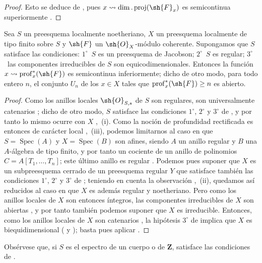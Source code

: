 \begin{proof}
Esto se deduce de , pues $x\leadsto\dim.\operatorname{proj}(\sh{F}_x)$ es semicontinua superiormente .
\end{proof}

\begin{proposition}[10.8.5]
\label{IV.10.8.5}
Sea $S$ un preesquema localmente noetheriano, $X$ un preesquema localmente de tipo finito sobre $S$ y $\sh{F}$ un $\sh{O}_X$-módulo coherente.
Supongamos que $S$ satisface las condiciones: $1^\circ$~$S$ es un preesquema de Jacobson; $2^\circ$~$S$ es regular; $3^\circ$~las componentes irreducibles de $S$ son equicodimensionales.
Entonces la función $x\leadsto\operatorname{prof}^*_x(\sh{F})$ es semicontinua inferiormente; dicho de otro modo, para todo entero $n$, el conjunto $U_n$ de los $x\in X$ tales que $\operatorname{prof}^*_x(\sh{F})\geq n$ es abierto.
\end{proposition}

\begin{proof}
Como los anillos locales $\sh{O}_{S,s}$ de $S$ son regulares, son universalmente catenarios ; dicho de otro modo, $S$ satisface las condiciones $1^\circ$, $2^\circ$ y $3^\circ$ de , y por tanto lo mismo ocurre con $X$ ,~(i).
Como la noción de profundidad rectificada es entonces de carácter local ,~(iii), podemos limitarnos al caso en que $S=\operatorname{Spec}(A)$ y $X=\operatorname{Spec}(B)$ son afines, siendo $A$ un anillo regular y $B$ una $A$-álgebra de tipo finito, y por tanto un cociente de un anillo de polinomios $C=A[T_1,\ldots,T_n]$; este último anillo es regular .
Podemos pues suponer que $X$ es un subpreesquema cerrado de un preesquema regular $Y$ que satisface también las condiciones $1^\circ$, $2^\circ$ y $3^\circ$ de ; teniendo en cuenta la observación ,~(ii), quedamos así reducidos al caso en que $X$ es además regular y noetheriano.
Pero como los anillos locales de $X$ son entonces íntegros, las componentes irreducibles de $X$ son
abiertas , y por tanto también podemos suponer que $X$ es irreducible.
Entonces, como los anillos locales de $X$ son catenarios , la hipótesis $3^\circ$ de  implica que $X$ es biequidimensional ( y ); basta pues aplicar .
\end{proof}

Obsérvese que, si $S$ es el espectro de un cuerpo o de $\mathbf{Z}$, satisface las condiciones de .

